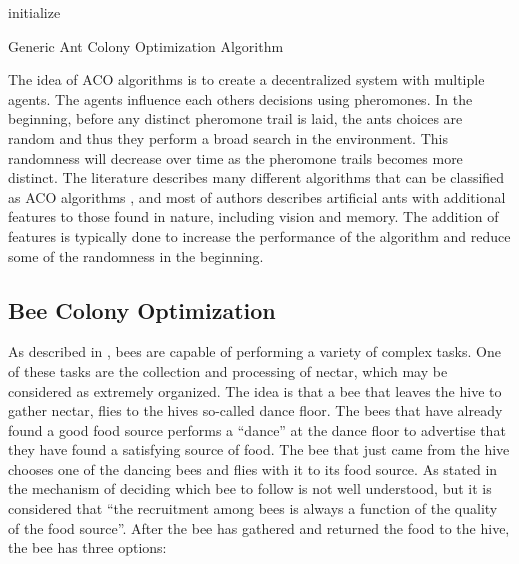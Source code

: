 \begin{algorithm}[H]
 initialize\;
 \caption{Generic Ant Colony Optimization Algorithm}
\end{algorithm}

The idea of ACO algorithms is to create a decentralized system with multiple agents. The agents influence each others decisions using pheromones. In the beginning, before any distinct pheromone trail is laid, the ants choices are random and thus they perform a broad search in the environment. This randomness will decrease over time as the pheromone trails becomes more distinct. The literature describes many different algorithms that can be classified as ACO algorithms \citep{salehi-nezhad07,tripathi09,jiang10, dias14}, and most of authors describes artificial ants with additional features to those found in nature, including vision and memory. The addition of features is typically done to increase the performance of the algorithm and reduce some of the randomness in the beginning.  


\subsection{Bee Colony Optimization}
As described in \citet{lucic03}, bees are capable of performing a variety of complex tasks. One of these tasks are the collection and processing of nectar, which may be considered as extremely organized. The idea is that a bee that leaves the hive to gather nectar, flies to the hives so-called dance floor. The bees that have already found a good food source performs a ``dance'' at the dance floor to advertise that they have found a satisfying source of food. The bee that just came from the hive chooses one of the dancing bees and flies with it to its food source. As stated in \citet{lucic03} the mechanism of deciding which bee to follow is not well understood, but it is considered that ``the recruitment among bees is always a function of the quality of the food source''. After the bee has gathered and returned the food to the hive, the bee has three options\citep{lucic03}:

